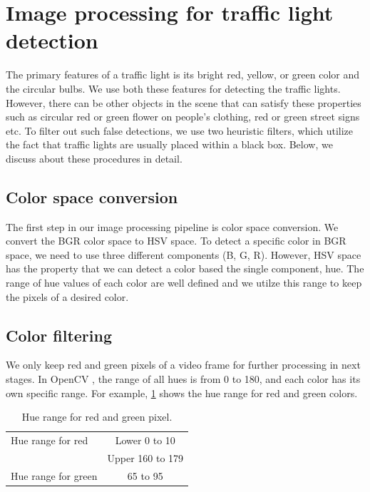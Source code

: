 \section{Image processing for traffic light detection}
The primary features of a traffic light is its bright red, yellow, or green color and the circular bulbs.
We use both these features for detecting the traffic lights. 
However, there can be other objects in the scene that can satisfy these properties such as circular red or green flower on people's clothing, red or green street signs etc.
To filter out such false detections, we use two heuristic filters, which utilize the fact that traffic lights are usually placed within a black box. 
Below, we discuss about these procedures in detail.



\subsection{Color space conversion}
The first step in our image processing pipeline is color space conversion.
We convert the BGR color space to HSV space.
To detect a specific color in BGR space, we need to use three different components (B, G, R).
However, HSV space has the property that we can detect a color based the single component, hue.
The range of hue values of each color are well defined and we utilze this range to keep the pixels of a desired color.


\subsection{Color filtering}
We only keep red and green pixels of a video frame for further processing in next stages.
In OpenCV \cite{opencv}, the range of all hues is from 0 to 180, and each color has its own specific range.
For example, \ref{t:hue_range} shows the hue range for red and green colors.

\begin{table}[h!]
  \centering
  \caption{Hue range for red and green pixel.}
  \label{t:hue_range}
  \begin{tabular}{  l | c  }
    \hline
    Hue range for red & Lower 0 to 10 \\ \cline{2-2}
    & Upper 160 to 179 \\
    \hline \hline
    Hue range for green & 65 to 95 \\
    \hline
  \end{tabular}
\end{table}



